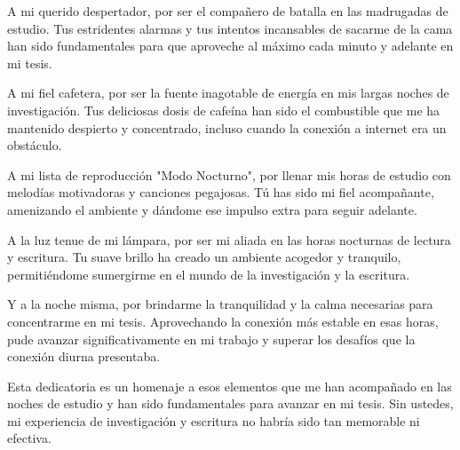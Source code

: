\documentclass[
	spanish, %
	letterpaper, oneside
]{book}
\begin{document}
\begin{dedicatory}
	A mi querido despertador, por ser el compañero de batalla en las madrugadas de estudio. Tus estridentes alarmas y tus intentos incansables de sacarme de la cama han sido fundamentales para que aproveche al máximo cada minuto y adelante en mi tesis.

	A mi fiel cafetera, por ser la fuente inagotable de energía en mis largas noches de investigación. Tus deliciosas dosis de cafeína han sido el combustible que me ha mantenido despierto y concentrado, incluso cuando la conexión a internet era un obstáculo.

	A mi lista de reproducción "Modo Nocturno", por llenar mis horas de estudio con melodías motivadoras y canciones pegajosas. Tú has sido mi fiel acompañante, amenizando el ambiente y dándome ese impulso extra para seguir adelante.

	A la luz tenue de mi lámpara, por ser mi aliada en las horas nocturnas de lectura y escritura. Tu suave brillo ha creado un ambiente acogedor y tranquilo, permitiéndome sumergirme en el mundo de la investigación y la escritura.

	Y a la noche misma, por brindarme la tranquilidad y la calma necesarias para concentrarme en mi tesis. Aprovechando la conexión más estable en esas horas, pude avanzar significativamente en mi trabajo y superar los desafíos que la conexión diurna presentaba.

	Esta dedicatoria es un homenaje a esos elementos que me han acompañado en las noches de estudio y han sido fundamentales para avanzar en mi tesis. Sin ustedes, mi experiencia de investigación y escritura no habría sido tan memorable ni efectiva.
\end{dedicatory}
\end{document}
